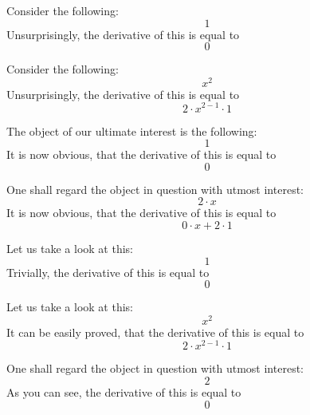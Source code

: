 \documentclass{article}
\begin{document}
Consider the following:
\begin{equation}
1 
\end{equation}
Unsurprisingly, the derivative of this is equal to
\begin{equation}
0 
\end{equation}

Consider the following:
\begin{equation}
x ^{2 } 
\end{equation}
Unsurprisingly, the derivative of this is equal to
\begin{equation}
2 \cdot x ^{2 - 1 } \cdot 1 
\end{equation}

The object of our ultimate interest is the following:
\begin{equation}
1 
\end{equation}
It is now obvious, that the derivative of this is equal to
\begin{equation}
0 
\end{equation}

One shall regard the object in question with utmost interest:
\begin{equation}
2 \cdot x 
\end{equation}
It is now obvious, that the derivative of this is equal to
\begin{equation}
0 \cdot x + 2 \cdot 1 
\end{equation}

Let us take a look at this:
\begin{equation}
1 
\end{equation}
Trivially, the derivative of this is equal to
\begin{equation}
0 
\end{equation}

Let us take a look at this:
\begin{equation}
x ^{2 } 
\end{equation}
It can be easily proved, that the derivative of this is equal to
\begin{equation}
2 \cdot x ^{2 - 1 } \cdot 1 
\end{equation}

One shall regard the object in question with utmost interest:
\begin{equation}
2 
\end{equation}
As you can see, the derivative of this is equal to
\begin{equation}
0 
\end{equation}
\end{document}

